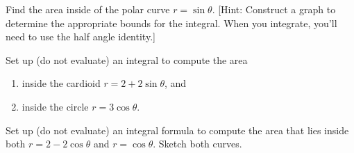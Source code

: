 \begin{problem} 
%
Find the area inside of the polar curve $r=\sin\theta$. [Hint: Construct a graph to determine the appropriate bounds for the integral. When you integrate, you'll need to use the half angle identity.] 
\end{problem}


\begin{problem}
Set up (do not evaluate) an integral to compute the area 
\begin{enumerate}
\item inside the cardioid $r=2+2\sin\theta$, and 
\item inside the circle $r=3\cos\theta$.
\end{enumerate}
\end{problem}

\begin{problem}
Set up (do not evaluate) an integral formula to compute the area that lies inside both $r=2-2\cos\theta$ and $r=\cos\theta$. Sketch both curves. 
\end{problem}

\clearpage

